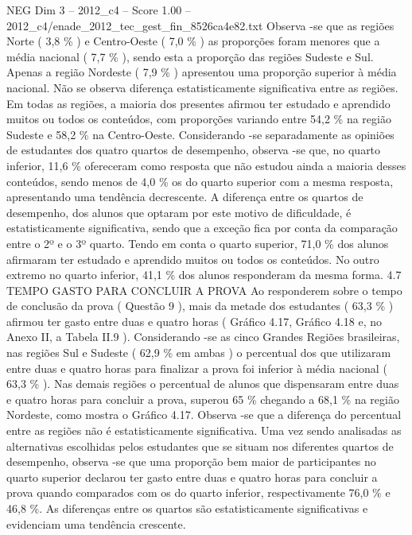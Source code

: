 \begin{textsample}{NEG Dim 3 – 2012\_c4 – Score 1.00 – 2012\_c4/enade\_2012\_tec\_gest\_fin\_8526ca4e82.txt}
Observa -se que as regiões Norte ( 3,8 \% ) e Centro-Oeste ( 7,0 \% ) as proporções foram menores que a média nacional ( 7,7 \% ), sendo esta a proporção das regiões Sudeste e Sul.
Apenas a região Nordeste ( 7,9 \% ) apresentou uma proporção superior à média nacional.
Não se observa diferença estatisticamente significativa entre as regiões.
Em todas as regiões, a maioria dos presentes afirmou ter estudado e aprendido muitos ou todos os conteúdos, com proporções variando entre 54,2 \% na região Sudeste e 58,2 \% na Centro-Oeste.
Considerando -se separadamente as opiniões de estudantes dos quatro quartos de desempenho, observa -se que, no quarto inferior, 11,6 \% ofereceram como resposta que não estudou ainda a maioria desses conteúdos, sendo menos de 4,0 \% os do quarto superior com a mesma resposta, apresentando uma tendência decrescente.
A diferença entre os quartos de desempenho, dos alunos que optaram por este motivo de dificuldade, é estatisticamente significativa, sendo que a exceção fica por conta da comparação entre o 2º e o 3º quarto.
Tendo em conta o quarto superior, 71,0 \% dos alunos afirmaram ter estudado e aprendido muitos ou todos os conteúdos.
No outro extremo no quarto inferior, 41,1 \% dos alunos responderam da mesma forma. 4.7 TEMPO GASTO PARA CONCLUIR A PROVA Ao responderem sobre o tempo de conclusão da prova ( Questão 9 ), mais da metade dos estudantes ( 63,3 \% ) afirmou ter gasto entre duas e quatro horas ( Gráfico 4.17, Gráfico 4.18 e, no Anexo II, a Tabela II.9 ).
Considerando -se as cinco Grandes Regiões brasileiras, nas regiões Sul e Sudeste ( 62,9 \% em ambas ) o percentual dos que utilizaram entre duas e quatro horas para finalizar a prova foi inferior à média nacional ( 63,3 \% ).
Nas demais regiões o percentual de alunos que dispensaram entre duas e quatro horas para concluir a prova, superou 65 \% chegando a 68,1 \% na região Nordeste, como mostra o Gráfico 4.17.
Observa -se que a diferença do percentual entre as regiões não é estatisticamente significativa.
Uma vez sendo analisadas as alternativas escolhidas pelos estudantes que se situam nos diferentes quartos de desempenho, observa -se que uma proporção bem maior de participantes no quarto superior declarou ter gasto entre duas e quatro horas para concluir a prova quando comparados com os do quarto inferior, respectivamente 76,0 \% e 46,8 \%.
As diferenças entre os quartos são estatisticamente significativas e evidenciam uma tendência crescente.

\end{textsample}
